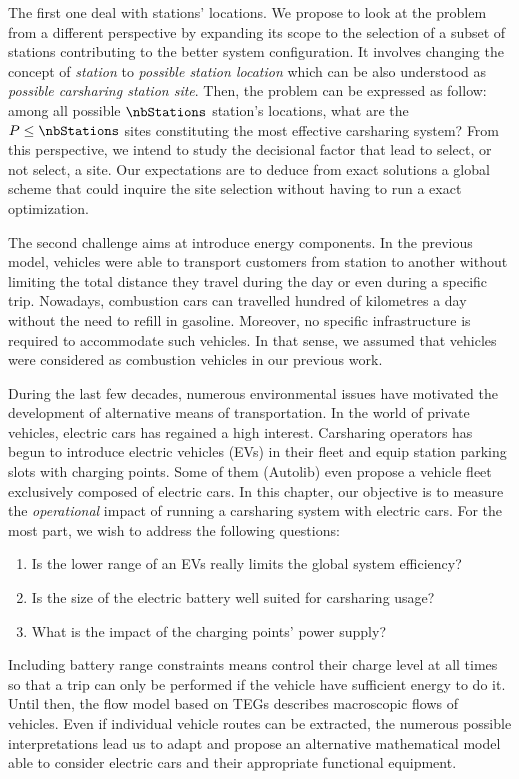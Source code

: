 \begin{bibunit}[ieeetr]
\bigskip
The first one deal with stations' locations.
We propose to look at the problem from a different perspective by expanding its scope to the selection of a subset of stations contributing to the better system configuration.
It involves changing the concept of \emph{station} to \emph{possible station location} which can be also understood as \emph{possible carsharing station site}.
Then, the problem can be expressed as follow: among all possible $\nbStations$ station's locations, what are the $P \leq \nbStations$ sites constituting the most effective carsharing system?
From this perspective, we intend to study the decisional factor that lead to select, or not select, a site.
Our expectations are to deduce from exact solutions a global scheme that could inquire the site selection without having to run a exact optimization.

\bigskip
The second challenge aims at introduce energy components.
In the previous model, vehicles were able to transport customers from station to another without limiting the total distance they travel during the day or even during a specific trip.
Nowadays, combustion cars can travelled hundred of kilometres a day without the need to refill in gasoline.
Moreover, no specific infrastructure is required to accommodate such vehicles.
In that sense, we assumed that vehicles were considered as combustion vehicles in our previous work.

During the last few decades, numerous environmental issues have motivated the development of alternative means of transportation.
In the world of private vehicles, electric cars has regained a high interest.
Carsharing operators has begun to introduce electric vehicles (EVs) in their fleet and equip station parking slots with charging points.
Some of them (\eg Autolib) even propose a vehicle fleet exclusively composed of electric cars.
In this chapter, our objective is to measure the \emph{operational} impact of running a carsharing system with electric cars.
For the most part, we wish to address the following questions:
\begin{enumerate}
\item Is the lower range of an EVs really limits the global system efficiency?
\item Is the size of the electric battery well suited for carsharing usage?
\item What is the impact of the charging points' power supply?
\end{enumerate}
Including battery range constraints means control their charge level at all times so that a trip can only be performed if the vehicle have sufficient energy to do it.
Until then, the flow model based on TEGs describes macroscopic flows of vehicles.
Even if individual vehicle routes can be extracted, the numerous possible interpretations lead us to adapt and propose an alternative mathematical model able to consider electric cars and their appropriate functional equipment.


\end{bibunit}
